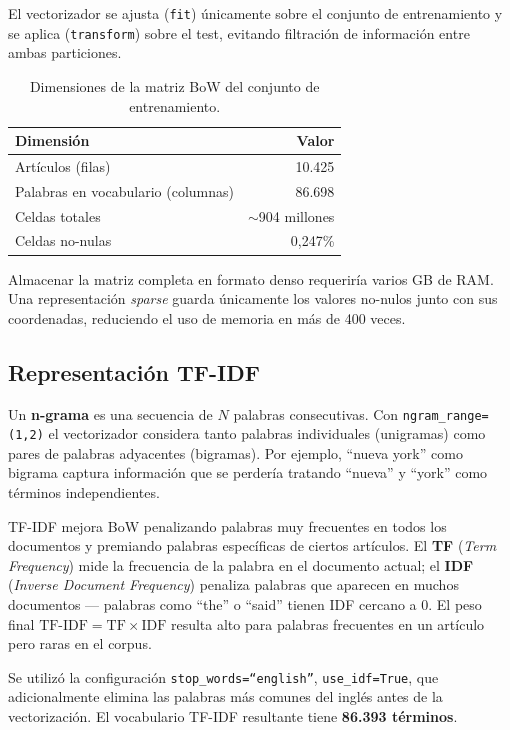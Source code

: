 \documentclass[12pt,a4paper]{article}
\begin{document}
El vectorizador se ajusta (\texttt{fit}) únicamente sobre el conjunto de entrenamiento y se aplica (\texttt{transform}) sobre el test, evitando filtración de información entre ambas particiones.

\begin{table}[H]
  \centering
  \begin{tabular}{lr}
    \toprule
    \textbf{Dimensión} & \textbf{Valor} \\
    \midrule
    Artículos (filas) & 10.425 \\
    Palabras en vocabulario (columnas) & 86.698 \\
    Celdas totales & $\sim$904 millones \\
    Celdas no-nulas & 0,247\% \\
    \bottomrule
  \end{tabular}
  \caption{Dimensiones de la matriz BoW del conjunto de entrenamiento.}
\end{table}

Almacenar la matriz completa en formato denso requeriría varios GB de RAM. Una representación \textit{sparse} guarda únicamente los valores no-nulos junto con sus coordenadas, reduciendo el uso de memoria en más de 400 veces.

\subsection{Representación TF-IDF}

Un \textbf{n-grama} es una secuencia de $N$ palabras consecutivas. Con \texttt{ngram\_range=(1,2)} el vectorizador considera tanto palabras individuales (unigramas) como pares de palabras adyacentes (bigramas). Por ejemplo, ``nueva york'' como bigrama captura información que se perdería tratando ``nueva'' y ``york'' como términos independientes.

TF-IDF mejora BoW penalizando palabras muy frecuentes en todos los documentos y premiando palabras específicas de ciertos artículos. El \textbf{TF} (\textit{Term Frequency}) mide la frecuencia de la palabra en el documento actual; el \textbf{IDF} (\textit{Inverse Document Frequency}) penaliza palabras que aparecen en muchos documentos --- palabras como ``the'' o ``said'' tienen IDF cercano a 0. El peso final $\text{TF-IDF} = \text{TF} \times \text{IDF}$ resulta alto para palabras frecuentes en un artículo pero raras en el corpus.

Se utilizó la configuración \texttt{stop\_words=``english''}, \texttt{use\_idf=True}, que adicionalmente elimina las palabras más comunes del inglés antes de la vectorización. El vocabulario TF-IDF resultante tiene \textbf{86.393 términos}.
\end{document}
